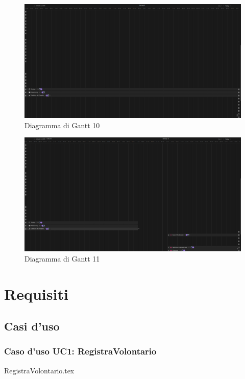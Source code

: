 \documentclass[12pt]{article}
\begin{document}
\begin{figure}[H]
    \includegraphics[width=\textwidth,keepaspectratio]{Immagini/Gantt/Iterazione 1/Gantt10.png}
        \caption{Diagramma di Gantt 10} 
        \label{fig:Gantt10}
\end{figure}

\begin{figure}[H]
    \includegraphics[width=\textwidth,keepaspectratio]{Immagini/Gantt/Iterazione 1/Gantt11.png}
        \caption{Diagramma di Gantt 11} 
        \label{fig:Gantt11}
\end{figure}


\section{Requisiti}
\subsection{Casi d'uso}

\subsubsection{Caso d'uso UC1: RegistraVolontario}
{RegistraVolontario.tex}
\end{document}
